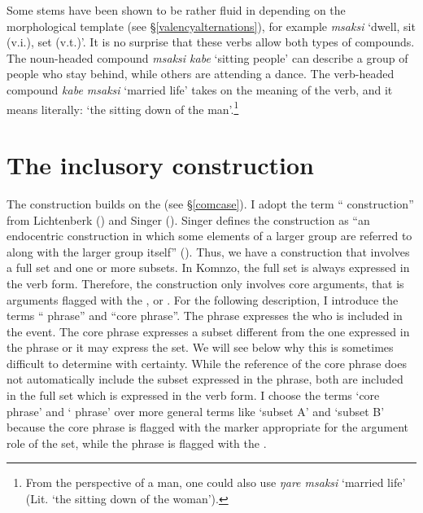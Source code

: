 Some stems have been shown to be rather fluid in  depending on the morphological template (see \S{}\ref{valencyalternations}), for example \emph{msaksi} `dwell, sit (v.i.), set (v.t.)'. It is no surprise that these verbs allow both types of compounds. The noun-headed compound \emph{msaksi kabe} `sitting people' can describe a group of people who stay behind, while others are attending a dance. The verb-headed compound \emph{kabe msaksi} `married life' takes on the  meaning of the verb, and it means literally: `the sitting down of the man'.\footnote{From the perspective of a man, one could also use \emph{ŋare msaksi} `married life' (Lit. `the sitting down of the woman').}

\section{The inclusory construction}\label{inclusorycontruction}

The  construction builds on the   (see \S{}\ref{comcase}). I adopt the term `` construction'' from Lichtenberk (\citeyear{Lichtenberk:2000hr}) and Singer (\citeyear{Singer:inclu}). Singer defines the  construction as ``an endocentric construction in which some elements of a larger group are referred to along with the larger group itself'' (\citeyear[1]{Singer:inclu}). Thus, we have a construction that involves a full set and one or more subsets. In Komnzo, the full set is always expressed in the verb form. Therefore, the  construction only involves core arguments, that is arguments flagged with the ,  or  . For the following description, I introduce the terms `` phrase'' and ``core phrase''. The  phrase expresses the  who is included in the event. The core phrase expresses a subset different from the one expressed in the  phrase or it may express the set. We will see below why this is sometimes difficult to determine with certainty. While the reference of the core phrase does not automatically include the subset expressed in the  phrase, both are included in the full set which is expressed in the verb form. I choose the terms `core phrase' and ` phrase' over more general terms like `subset A' and `subset B' because the core phrase is flagged with the  marker appropriate for the argument role of the set, while the  phrase is flagged with the  .\\

